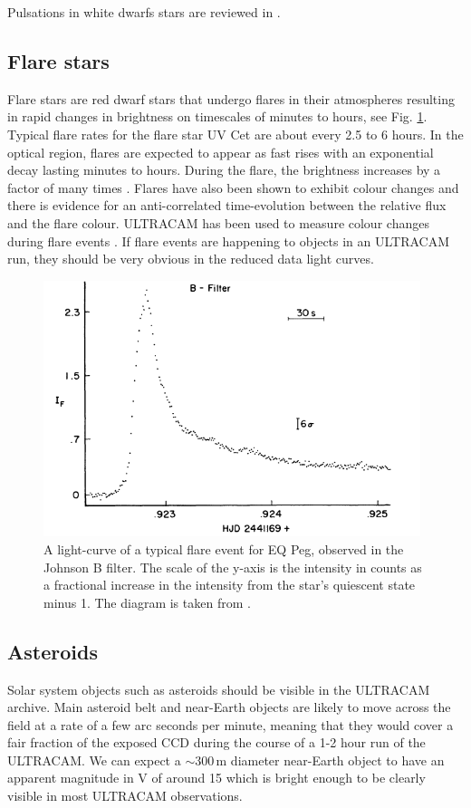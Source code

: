 Pulsations in white dwarfs stars are reviewed in \citet{wingetreview}.

\subsection{Flare stars}
Flare stars are red dwarf stars that undergo flares in their atmospheres resulting in rapid changes in brightness on timescales of minutes to hours, see Fig. \ref{fig:flare}. Typical flare rates for the flare star {UV Cet} are about every 2.5 to 6 hours. In the optical region, flares are expected to appear as fast rises with an exponential decay lasting minutes to hours. During the flare, the brightness increases by a factor of many times \citep{typicalflares}. Flares have also been shown to exhibit colour changes and there is evidence for an anti-correlated time-evolution between the relative flux and the flare colour. ULTRACAM has been used to measure colour changes during flare events \citep{ULTRACAMFlare}. If flare events are happening to objects in an ULTRACAM run, they should be very obvious in the reduced data light curves.  


\begin{figure}
\centering
\includegraphics[width=110mm]{images/EQ_Peg_typical_flare.png}
\caption{A light-curve of a typical flare event for EQ Peg, observed in the Johnson B filter. The scale of the y-axis is the intensity in counts as a fractional increase in the intensity from the star's quiescent state minus 1. The diagram is taken from \citet{typicalflares}. }
\label{fig:flare}
\end{figure}

\subsection{Asteroids}
Solar system objects such as asteroids should be visible in the ULTRACAM archive. Main asteroid belt and near-Earth objects are likely to move across the field at a rate of a few arc seconds per minute, meaning that they would cover a fair fraction of the exposed CCD during the course of a 1-2 hour run of the ULTRACAM. We can expect a $\sim 300\,\mbox{m}$ diameter near-Earth object to have an apparent magnitude in V of around 15 \citep{neosmalltelescope} which is bright enough to be clearly visible in most ULTRACAM observations. 

